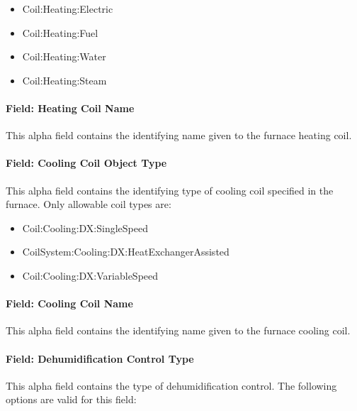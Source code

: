 \begin{itemize}
\item
  Coil:Heating:Electric
\item
  Coil:Heating:Fuel
\item
  Coil:Heating:Water
\item
  Coil:Heating:Steam
\end{itemize}

\paragraph{Field: Heating Coil Name}\label{field-heating-coil-name-1-000}

This alpha field contains the identifying name given to the furnace heating coil.

\paragraph{Field: Cooling Coil Object Type}\label{field-cooling-coil-object-type-1-000}

This alpha field contains the identifying type of cooling coil specified in the furnace. Only allowable coil types are:

\begin{itemize}
\item
  Coil:Cooling:DX:SingleSpeed
\item
  CoilSystem:Cooling:DX:HeatExchangerAssisted
\item
  Coil:Cooling:DX:VariableSpeed
\end{itemize}

\paragraph{Field: Cooling Coil Name}\label{field-cooling-coil-name-1-000}

This alpha field contains the identifying name given to the furnace cooling coil.

\paragraph{Field: Dehumidification Control Type}\label{field-dehumidification-control-type-1-000}

This alpha field contains the type of dehumidification control. The following options are valid for this field:

